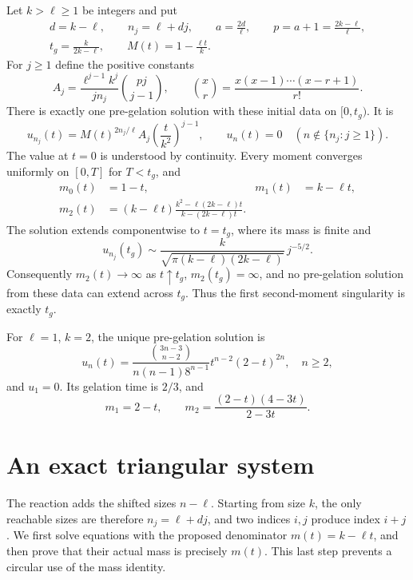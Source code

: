 \documentclass[11pt,a4paper]{report}
\begin{document}
\begin{theorem}\label{thm:main}
Let $k>\ell\ge1$ be integers and put
\begin{gather*}
d=k-\ell,\qquad n_j=\ell+dj,\qquad
a=\frac{2d}{\ell},\qquad p=a+1=\frac{2k-\ell}{\ell},\\
t_g=\frac{k}{2k-\ell},\qquad M(t)=1-\frac{\ell t}{k}.
\end{gather*}
For $j\ge1$ define the positive constants
\begin{equation}\label{eq:A}
A_j=\frac{\ell^{j-1}k^j}{j n_j}\binom{pj}{j-1},
\qquad
\binom{x}{r}=\frac{x(x-1)\cdots(x-r+1)}{r!}.
\end{equation}
There is exactly one pre-gelation solution with these initial data on $[0,t_g)$. It is
\begin{equation}\label{eq:u}
u_{n_j}(t)=M(t)^{2n_j/\ell} A_j\left(\frac{t}{k^2}\right)^{j-1},
\qquad u_n(t)=0\quad(n\notin\{n_j:j\ge1\}).
\end{equation}
The value at $t=0$ is understood by continuity. Every moment converges uniformly on $[0,T]$ for $T<t_g$, and
\begin{align}
m_0(t)&=1-t,&m_1(t)&=k-\ell t,\label{eq:mass}\\
m_2(t)&=(k-\ell t)\frac{k^2-\ell(2k-\ell)t}{k-(2k-\ell)t}.\label{eq:m2}
\end{align}
The solution extends componentwise to $t=t_g$, where its mass is finite and
\begin{equation}\label{eq:tail}
u_{n_j}(t_g)\sim\frac{k}{\sqrt{\pi(k-\ell)(2k-\ell)}}\,j^{-5/2}.
\end{equation}
Consequently $m_2(t)\to\infty$ as $t\uparrow t_g$, $m_2(t_g)=\infty$, and no pre-gelation solution from these data can extend across $t_g$. Thus the first second-moment singularity is exactly $t_g$.
\end{theorem}

\begin{corollary}\label{cor:dimer}
For $\ell=1$, $k=2$, the unique pre-gelation solution is
\begin{equation}\label{eq:dimers}
u_n(t)=\frac{\binom{3n-3}{n-2}}{n(n-1)8^{n-1}}
t^{n-2}(2-t)^{2n},\quad n\ge2,
\end{equation}
and $u_1=0$. Its gelation time is $2/3$, and
\[
m_1=2-t,\qquad m_2=\frac{(2-t)(4-3t)}{2-3t}.
\]
\end{corollary}

\section{An exact triangular system}
The reaction adds the shifted sizes $n-\ell$. Starting from size $k$, the only reachable sizes are therefore $n_j=\ell+dj$, and two indices $i,j$ produce index $i+j$. We first solve equations with the proposed denominator $m(t)=k-\ell t$, and then prove that their actual mass is precisely $m(t)$. This last step prevents a circular use of the mass identity.
\end{document}
